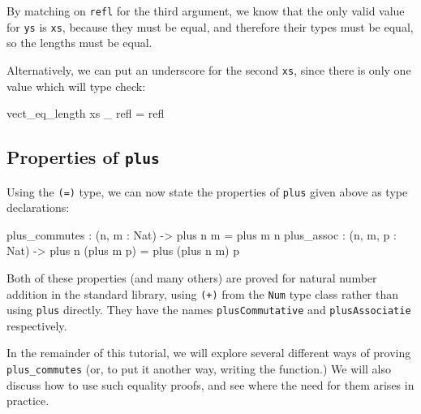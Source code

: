 \noindent
By matching on \texttt{refl} for the third argument, we know that the only
valid value for \texttt{ys} is \texttt{xs}, because they must be equal, and
therefore their types must be equal, so the lengths must be equal.

Alternatively, we can put an underscore for the second \texttt{xs}, since there
is only one value which will type check:

\begin{code}
vect_eq_length xs _ refl = refl
\end{code}

\subsection{Properties of \texttt{plus}}

Using the \texttt{(=)} type, we can now state the properties of \texttt{plus}
given above as \Idris{} type declarations:

\begin{code}
plus_commutes : (n, m : Nat) -> plus n m = plus m n
plus_assoc : (n, m, p : Nat) -> plus n (plus m p) = plus (plus n m) p
\end{code}

\noindent
Both of these properties (and many others)
are proved for natural number addition in the \Idris{}
standard library, using \texttt{(+)} from the \texttt{Num} type class rather
than using \texttt{plus} directly. They have the names \texttt{plusCommutative}
and \texttt{plusAssociatie} respectively.

In the remainder of this tutorial, we will explore several different ways
of proving \texttt{plus\_commutes} (or, to put it another way, writing the
function.) We will also discuss how to use such equality proofs, and see where
the need for them arises in practice.

